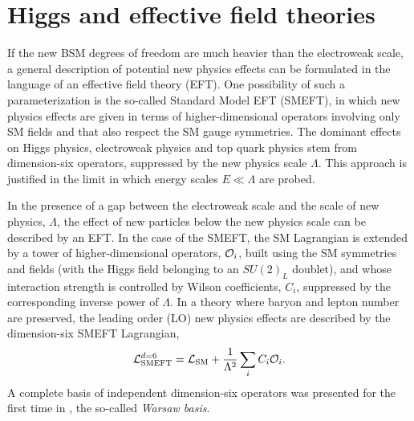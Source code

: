 \chapter{Higgs and effective field theories }\label{chap:HiggsEFT}
\par If the new BSM degrees of freedom are much heavier than the electroweak scale, a general description of potential new physics effects can be formulated in the language of an effective field theory (EFT). One possibility of such a parameterization is the so-called Standard Model EFT (SMEFT), in which new physics effects are given in terms of higher-dimensional operators involving only SM fields and that also respect the SM gauge symmetries.  The dominant effects on Higgs physics, electroweak physics and top quark physics stem from dimension-six operators, suppressed by the new physics scale $\Lambda$. This approach is justified in the limit 
in which energy scales $E\ll \Lambda$ are probed. 
 \par In the presence of a gap between the electroweak scale and the scale of new physics, $\Lambda$, the effect of new particles below the new physics scale can be described by an EFT. In the case of the SMEFT, the SM Lagrangian is extended by a tower of higher-dimensional operators, ${\cal O}_i$, built using the SM symmetries and fields (with the Higgs field belonging to an $SU(2)_L$ doublet), and whose interaction strength is controlled by Wilson coefficients, $C_i$, suppressed by the corresponding inverse power of $\Lambda$. In a theory where baryon and lepton number are preserved, the leading order (LO) new physics effects are described by the dimension-six  SMEFT Lagrangian,
%
\begin{equation}
	\mathcal{L}_{\mathrm{SMEFT}}^{d=6}=\mathcal{L}_{\mathrm{SM}} + \frac{1}{\Lambda^2}\sum_i C_i  {\cal O}_i.
\end{equation}
A complete basis of independent dimension-six operators was presented for the first time in \cite{Grzadkowski:2010es}, the so-called \textit{ Warsaw basis}.